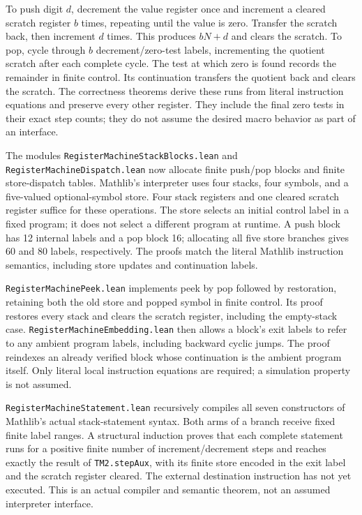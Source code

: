 \documentclass[11pt]{article}
\newcommand{\code}[1]{{\small\nolinkurl{#1}}}
\begin{document}
To push digit $d$, decrement the value register once and increment a
cleared scratch register $b$ times, repeating until the value is zero.
Transfer the scratch back, then increment $d$ times. This produces $bN+d$
and clears the scratch. To pop, cycle through $b$ decrement/zero-test
labels, incrementing the quotient scratch after each complete cycle.
The test at which zero is found records the remainder in finite control.
Its continuation transfers the quotient back and clears the scratch.
The correctness theorems derive these runs from literal instruction
equations and preserve every other register. They include the final zero
tests in their exact step counts; they do not assume the desired macro
behavior as part of an interface.

The modules \code{RegisterMachineStackBlocks.lean} and
\code{RegisterMachineDispatch.lean} now allocate finite push/pop blocks
and finite store-dispatch tables. Mathlib's interpreter uses four stacks,
four symbols, and a five-valued optional-symbol store. Four stack
registers and one cleared scratch register suffice for these operations.
The store selects an initial control label in a fixed program; it does
not select a different program at runtime. A push block has 12 internal
labels and a pop block 16; allocating all five store branches gives 60
and 80 labels, respectively. The proofs match the literal Mathlib
instruction semantics, including store updates and continuation labels.

\code{RegisterMachinePeek.lean} implements peek by pop followed by
restoration, retaining both the old store and popped symbol in finite
control. Its proof restores every stack and clears the scratch register,
including the empty-stack case. \code{RegisterMachineEmbedding.lean}
then allows a block's exit labels to refer to any ambient program labels,
including backward cyclic jumps. The proof reindexes an already verified
block whose continuation is the ambient program itself. Only literal
local instruction equations are required; a simulation property is not
assumed.

\code{RegisterMachineStatement.lean} recursively compiles all seven
constructors of Mathlib's actual stack-statement syntax. Both arms of a
branch receive fixed finite label ranges. A structural induction proves
that each complete statement runs for a positive finite number of
increment/decrement steps and reaches exactly the result of
\code{TM2.stepAux}, with its finite store encoded in the exit label and
the scratch register cleared. The external destination instruction has
not yet executed. This is an actual compiler and semantic theorem, not
an assumed interpreter interface.
\end{document}
